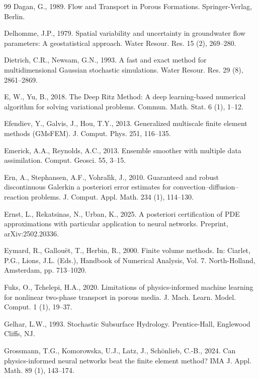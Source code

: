 \documentclass[preprint,12pt,authoryear]{elsarticle}
\begin{document}
\begin{thebibliography}{99}
Dagan, G., 1989. Flow and Transport in Porous Formations. Springer-Verlag, Berlin.

Delhomme, J.P., 1979. Spatial variability and uncertainty in groundwater flow parameters: A geostatistical approach. Water Resour. Res. 15 (2), 269--280.

Dietrich, C.R., Newsam, G.N., 1993. A fast and exact method for multidimensional Gaussian stochastic simulations. Water Resour. Res. 29 (8), 2861--2869.

E, W., Yu, B., 2018. The Deep Ritz Method: A deep learning-based numerical algorithm for solving variational problems. Commun. Math. Stat. 6 (1), 1--12.

Efendiev, Y., Galvis, J., Hou, T.Y., 2013. Generalized multiscale finite element methods (GMsFEM). J. Comput. Phys. 251, 116--135.

Emerick, A.A., Reynolds, A.C., 2013. Ensemble smoother with multiple data assimilation. Comput. Geosci. 55, 3--15.

Ern, A., Stephansen, A.F., Vohral\'{\i}k, J., 2010. Guaranteed and robust discontinuous Galerkin a posteriori error estimates for convection--diffusion--reaction problems. J. Comput. Appl. Math. 234 (1), 114--130.

Ernst, L., Rekatsinas, N., Urban, K., 2025. A posteriori certification of PDE approximations with particular application to neural networks. Preprint, arXiv:2502.20336.

Eymard, R., Gallou\"{e}t, T., Herbin, R., 2000. Finite volume methods. In: Ciarlet, P.G., Lions, J.L. (Eds.), Handbook of Numerical Analysis, Vol. 7. North-Holland, Amsterdam, pp. 713--1020.

Fuks, O., Tchelepi, H.A., 2020. Limitations of physics-informed machine learning for nonlinear two-phase transport in porous media. J. Mach. Learn. Model. Comput. 1 (1), 19--37.

Gelhar, L.W., 1993. Stochastic Subsurface Hydrology. Prentice-Hall, Englewood Cliffs, NJ.

Grossmann, T.G., Komorowska, U.J., Latz, J., Sch\"{o}nlieb, C.-B., 2024. Can physics-informed neural networks beat the finite element method? IMA J. Appl. Math. 89 (1), 143--174.


\end{thebibliography}
\end{document}
